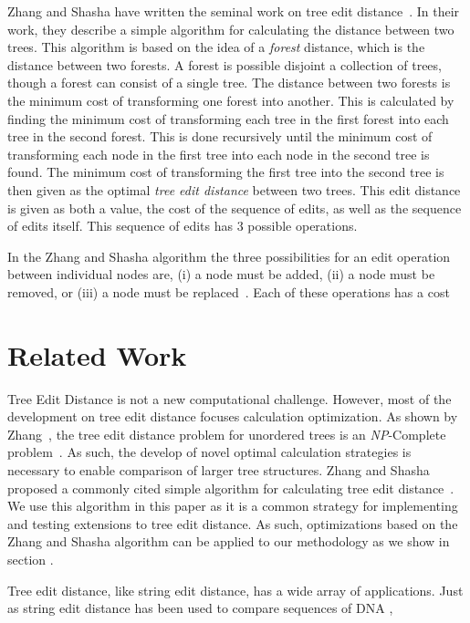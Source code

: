 Zhang and Shasha have written the seminal work on tree edit distance~\cite{zhang_simple_1989}. In their work, they describe a simple algorithm for calculating the distance between two trees. This algorithm is based on the idea of a \textit{forest} distance, which is the distance between two forests. A forest is possible disjoint a collection of trees, though a forest can consist of a single tree. The distance between two forests is the minimum cost of transforming one forest into another. This is calculated by finding the minimum cost of transforming each tree in the first forest into each tree in the second forest. This is done recursively until the minimum cost of transforming each node in the first tree into each node in the second tree is found. The minimum cost of transforming the first tree into the second tree is then given as the optimal \emph{tree edit distance} between two trees. This edit distance is given as both a value, the cost of the sequence of edits, as well as the sequence of edits itself. This sequence of edits has 3 possible operations.

In the Zhang and Shasha algorithm the three possibilities for an edit operation between individual nodes are, (i) a node must be added, (ii) a node must be removed, or (iii) a node must be replaced~\cite{zhang_simple_1989}. Each of these operations has a cost 




\section{Related Work}

Tree Edit Distance is not a new computational challenge. However, most of the development on tree edit distance focuses calculation optimization. As shown by Zhang~\etal, the tree edit distance problem for unordered trees is an \textit{NP}-Complete problem~\cite{zhang_editing_1992}. As such, the develop of novel optimal calculation strategies is necessary to enable comparison of larger tree structures. Zhang and Shasha proposed a commonly cited simple algorithm for calculating tree edit distance~\cite{zhang_simple_1989}. We use this algorithm in this paper as it is a common strategy for implementing and testing extensions to tree edit distance. As such, optimizations based on the Zhang and Shasha algorithm can be applied to our methodology as we show in section .

Tree edit distance, like string edit distance, has a wide array of applications. Just as string edit distance has been used to compare sequences of DNA ,
